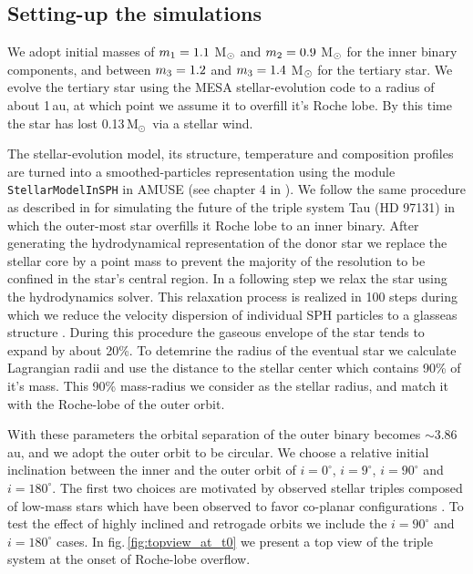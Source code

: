 \documentclass{aastex62}
\newcommand{\MSun}{\mbox{M$_\odot$}}
\begin{document}
\subsection{Setting-up the simulations}

We adopt initial masses of $m_{\rm 1} = 1.1$ M$_{\rm \odot}$ and
$m_{\rm 2} = 0.9$ M$_{\rm \odot}$ for the inner binary components, and
between $m_{\rm 3} = 1.2$ and $m_{\rm 3} = 1.4$ M$_{\rm \odot}$ for
the tertiary star.  We evolve the tertiary star using the MESA
stellar-evolution code \cite{2011ApJS..192....3P} to a radius of about
1\,au, at which point we assume it to overfill it's Roche lobe.  By
this time the star has lost 0.13\,\MSun\, via a stellar wind.

The stellar-evolution model, its structure, temperature and
composition profiles are turned into a smoothed-particles
representation using the module {\tt StellarModelInSPH} in AMUSE (see
chapter 4 in \cite{AMUSE}).  We follow the same procedure as described
in \cite{2014MNRAS.438.1909D} for simulating the future of the triple
system \xi Tau (HD 97131) in which the outer-most star overfills it
Roche lobe to an inner binary.  After generating the hydrodynamical
representation of the donor star we replace the stellar core by a
point mass to prevent the majority of the resolution to be confined in
the star's central region.  In a following step we relax the star
using the hydrodynamics solver. This relaxation process is realized in
100 steps during which we reduce the velocity dispersion of individual
SPH particles to a glasseas structure \citep[see, for example, \S\,3.3
  on page 40 in][]{1994astro.ph.10043W}. During this procedure the
gaseous envelope of the star tends to expand by about 20\%.  To
detemrine the radius of the eventual star we calculate Lagrangian
radii and use the distance to the stellar center which contains 90\%
of it's mass. This 90\% mass-radius we consider as the stellar radius,
and match it with the Roche-lobe of the outer orbit.

With these parameters the orbital separation of the outer binary
becomes $\sim 3.86$\,au, and we adopt the outer orbit to be circular.
We choose a relative initial inclination between the inner and the
outer orbit of $i = 0^\circ$, $i = 9^\circ$, $i = 90^\circ$ and $i =
180^\circ$.  The first two choices are motivated by observed stellar
triples composed of low-mass stars which have been observed to favor
co-planar configurations \citep{moe18}. To test the effect of highly
inclined and retrogade orbits we include the $i = 90^\circ$ and $i =
180^\circ$ cases.  In fig.\,\ref{fig:topview_at_t0} we present a top
view of the triple system at the onset of Roche-lobe overflow.
\end{document}
